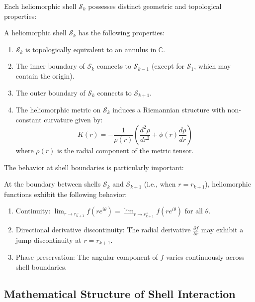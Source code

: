 Each heliomorphic shell $\mathcal{S}_k$ possesses distinct geometric and topological properties:

\begin{proposition}
A heliomorphic shell $\mathcal{S}_k$ has the following properties:
\begin{enumerate}
    \item $\mathcal{S}_k$ is topologically equivalent to an annulus in $\mathbb{C}$.
    \item The inner boundary of $\mathcal{S}_k$ connects to $\mathcal{S}_{k-1}$ (except for $\mathcal{S}_1$, which may contain the origin).
    \item The outer boundary of $\mathcal{S}_k$ connects to $\mathcal{S}_{k+1}$.
    \item The heliomorphic metric on $\mathcal{S}_k$ induces a Riemannian structure with non-constant curvature given by:
    \begin{equation}
    K(r) = -\frac{1}{\rho(r)}\left(\frac{d^2\rho}{dr^2} + \phi(r)\frac{d\rho}{dr}\right)
    \end{equation}
    where $\rho(r)$ is the radial component of the metric tensor.
\end{enumerate}
\end{proposition}

The behavior at shell boundaries is particularly important:

\begin{theorem}
At the boundary between shells $\mathcal{S}_k$ and $\mathcal{S}_{k+1}$ (i.e., when $r = r_{k+1}$), heliomorphic functions exhibit the following behavior:
\begin{enumerate}
    \item Continuity: $\lim_{r \to r_{k+1}^-} f(re^{i\theta}) = \lim_{r \to r_{k+1}^+} f(re^{i\theta})$ for all $\theta$.
    \item Directional derivative discontinuity: The radial derivative $\frac{\partial f}{\partial r}$ may exhibit a jump discontinuity at $r = r_{k+1}$.
    \item Phase preservation: The angular component of $f$ varies continuously across shell boundaries.
\end{enumerate}
\end{theorem}

\subsection{Mathematical Structure of Shell Interaction}

